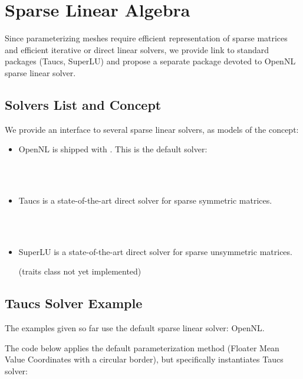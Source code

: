 \section{Sparse Linear Algebra}

Since parameterizing meshes require
efficient representation of sparse matrices and efficient iterative or
direct linear solvers, we provide link to standard packages ({\sc Taucs}, SuperLU)
and propose a separate package devoted to OpenNL sparse linear solver.

\subsection{Solvers List and Concept}

We provide an interface to several sparse linear solvers, as models
of the  concept:

\begin{itemize}

\item OpenNL \cite{cgal:l-nmdgp-05} is shipped with \cgal. This is the default solver:

  \\
  \\

\item {\sc Taucs} is a state-of-the-art direct solver for sparse symmetric matrices.

  \\
  \\

\item SuperLU is a state-of-the-art direct solver for sparse unsymmetric matrices.

(traits class not yet implemented)

\end{itemize}


\subsection{{\sc Taucs} Solver Example}

The examples given so far use the default sparse linear solver: OpenNL.

The code below applies the default parameterization method
(Floater Mean Value Coordinates with a circular border),
but specifically instantiates {\sc Taucs} solver:

